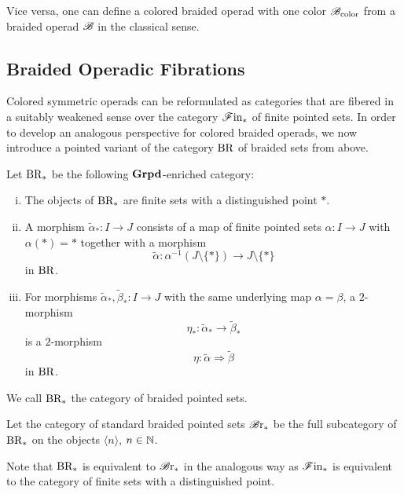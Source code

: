\begin{rem} Vice versa, one can define a colored braided operad with one color
    $\mathscr{B}_{\text{color}}$ from a braided operad $\mathscr{B}$ in the classical sense. 
\end{rem}


\subsection{Braided Operadic Fibrations}

Colored symmetric operads can be reformulated as categories that are fibered in
a suitably weakened sense over the category $\mathscr{F} \text{in}_{\ast}$ of finite pointed sets. In
order to develop an analogous perspective for colored braided operads, we now
introduce a pointed variant of the category $\operatorname{BR}$ of braided sets from above. 

\begin{defin}
    Let $\operatorname{BR_{\ast}}$ be the following $\operatorname{\textbf{Grpd}}$-enriched category:
    \begin{enumerate}[(i)]
        \item The objects of $\operatorname{BR_{\ast}}$ are finite sets with a distinguished point
        $\ast$.
        \item A morphism $\widetilde{\alpha}_{\ast} \colon I \to J$ consists of
        a map of finite pointed sets $\alpha \colon I \to J$ with
        $\alpha(\ast)=\ast$ together with a morphism
        \[
            \widetilde{\alpha} \colon \alpha^{-1}(J \setminus \{\ast\}) \to J \setminus \{\ast\}
        \]
        in $\operatorname{BR}$.
        \item For morphisms $\widetilde{\alpha}_{\ast}, \widetilde{\beta}_{\ast}
        \colon I \to J$ with the same underlying map $\alpha = \beta$, a
        $2$-morphism 
        $$\eta_{\ast} \colon \widetilde{\alpha}_{\ast} \to
        \widetilde{\beta}_{\ast}$$ is a $2$-morphism 
        $$\eta \colon \widetilde{\alpha} \Rightarrow \widetilde{\beta}$$ in
        $\operatorname{BR}$.
    \end{enumerate}
    We call $\operatorname{BR_{\ast}}$ the category of braided pointed sets.
\end{defin}

\begin{defin}
    Let the category of standard braided pointed sets $\mathscr{B} \text{r}_{\ast}$ be the full
    subcategory of $\operatorname{BR_{\ast}}$ on the objects $\langle n \rangle$, $n \in \mathbb{N}$.
\end{defin}

\begin{rem}
    Note that $\operatorname{BR_{\ast}}$ is equivalent to $\mathscr{B} \text{r}_{\ast}$ in the analogous way as $\mathscr{F} \text{in}_{\ast}$
    is equivalent to the category of finite sets with a distinguished point.
\end{rem}

